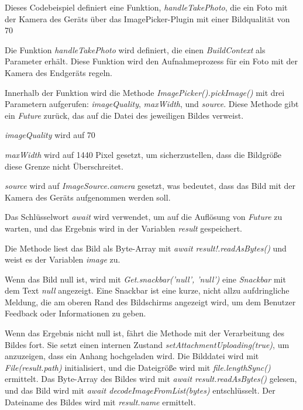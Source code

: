 Dieses Codebeispiel definiert eine Funktion, \textit{handleTakePhoto}, die ein Foto mit der Kamera des Geräts über das ImagePicker-Plugin mit einer Bildqualität von 70%

Die Funktion \textit{handleTakePhoto} wird definiert, die einen \textit{BuildContext} als Parameter erhält. Diese Funktion wird den Aufnahmeprozess für ein Foto mit der Kamera des Endgeräts regeln.

Innerhalb der Funktion wird die Methode \textit{ImagePicker().pickImage()} mit drei Parametern aufgerufen: \textit{imageQuality}, \textit{maxWidth}, und \textit{source}. Diese Methode gibt ein \textit{Future} zurück, das auf die Datei des jeweiligen Bildes verweist.

\textit{imageQuality} wird auf 70%

\textit{maxWidth} wird auf 1440 Pixel gesetzt, um sicherzustellen, dass die Bildgröße diese Grenze nicht Überschreitet.

\textit{source} wird auf \textit{ImageSource.camera} gesetzt, was bedeutet, dass das Bild mit der Kamera des Geräts aufgenommen werden soll.

Das Schlüsselwort \textit{await} wird verwendet, um auf die Auflösung von \textit{Future} zu warten, und das Ergebnis wird in der Variablen \textit{result} gespeichert.

Die Methode liest das Bild als Byte-Array mit \textit{await result!.readAsBytes()} und weist es der Variablen \textit{image} zu.

Wenn das Bild null ist, wird mit \textit{Get.snackbar('null', 'null')} eine \textit{Snackbar} mit dem Text \textit{null} angezeigt. Eine Snackbar ist eine kurze, nicht allzu aufdringliche Meldung, die am oberen Rand des Bildschirms angezeigt wird, um dem Benutzer Feedback oder Informationen zu geben.

Wenn das Ergebnis nicht null ist, fährt die Methode mit der Verarbeitung des Bildes fort.
Sie setzt einen internen Zustand \textit{setAttachmentUploading(true)}, um anzuzeigen, dass ein Anhang hochgeladen wird.
Die Bilddatei wird mit \textit{File(result.path)} initialisiert, und die Dateigröße wird mit \textit{file.lengthSync()} ermittelt.
Das Byte-Array des Bildes wird mit \textit{await result.readAsBytes()} gelesen, und das Bild wird mit \textit{await decodeImageFromList(bytes)} entschlüsselt.
Der Dateiname des Bildes wird mit \textit{result.name} ermittelt.

